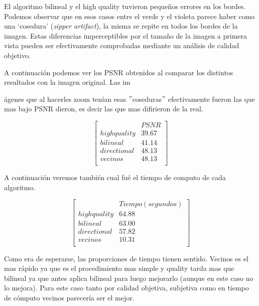 El algoritmo bilineal y el high quality tuvieron pequeños errores en los bordes. Podemos observar que en esos casos entre el verde y el violeta parece haber como una `cosedura' (\textit{zipper artifact}), la misma se repite en todos los bordes de la imagen. Estas diferencias imperceptibles por el tamaño de la imagen a primera vista pueden ser efectivamente comprobadas mediante un análisis de calidad objetivo. 

A continuación podemos ver los PSNR obtenidos al comparar los distintos resultados con la imagen original. Las im{ágenes que al hacerles zoom tenían esas $"$coseduras$"$ efectivamente fueron las que mas bajo PSNR dieron, es decir las que mas difirieron de la real.

$$ 
\begin{bmatrix}
           &      PSNR     \\
       highquality    &   39.67   \\
       bilineal    &      41.14   \\
       directional    &      48.13    \\
       vecinos   &      48.13      \\
\end{bmatrix} 
$$

A continuación veremos también cual fué el tiempo de computo de cada algoritmo.

$$ 
\begin{bmatrix}
           &      Tiempo (segundos)     \\
       highquality    &   64.88   \\
       bilineal    &      63.00   \\
       directional    &      57.82    \\
       vecinos   &      10.31      \\
\end{bmatrix} 
$$

Como era de esperarse, las proporciones de tiempo tienen sentido. Vecinos es el mas rápido ya que es el procedimiento mas simple y quality tarda mas que bilineal ya que antes aplica bilineal para luego mejorarlo (aunque en este caso no lo mejora). Para este caso tanto por calidad objetiva, subjetiva como en tiempo de cómputo vecinos parecería ser el mejor.


\clearpage
}
